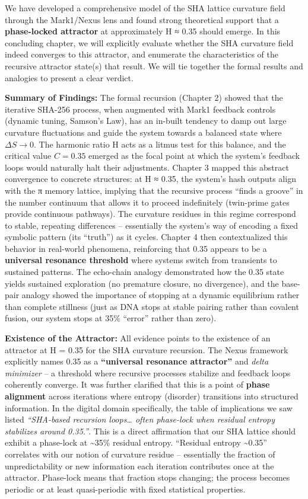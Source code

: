 \documentclass[11pt]{article}
\begin{document}
We have developed a comprehensive model of the SHA lattice curvature
field through the Mark1/Nexus lens and found strong theoretical support
that a \textbf{phase-locked attractor} at approximately H ≈ 0.35 should
emerge. In this concluding chapter, we will explicitly evaluate whether
the SHA curvature field indeed converges to this attractor, and
enumerate the characteristics of the recursive attractor state(s) that
result. We will tie together the formal results and analogies to present
a clear verdict.

\textbf{Summary of Findings:} The formal recursion (Chapter 2) showed
that the iterative SHA-256 process, when augmented with Mark1 feedback
controls (dynamic tuning, Samson's Law), has an in-built tendency to
damp out large curvature fluctuations and guide the system towards a
balanced state where \(\Delta S → 0\). The harmonic ratio H acts as a
litmus test for this balance, and the critical value \(C = 0.35\)
emerged as the focal point at which the system's feedback loops would
naturally halt their adjustments. Chapter 3 mapped this abstract
convergence to concrete structures: at H ≈ 0.35, the system's hash
outputs align with the π memory lattice, implying that the recursive
process ``finds a groove'' in the number continuum that allows it to
proceed indefinitely (twin-prime gates provide continuous pathways). The
curvature residues in this regime correspond to stable, repeating
differences -- essentially the system's way of encoding a fixed symbolic
pattern (its ``truth'') as it cycles. Chapter 4 then contextualized this
behavior in real-world phenomena, reinforcing that 0.35 appears to be a
\textbf{universal resonance threshold} where systems switch from
transients to sustained patterns. The echo-chain analogy demonstrated
how the 0.35 state yields sustained exploration (no premature closure,
no divergence), and the base-pair analogy showed the importance of
stopping at a dynamic equilibrium rather than complete stillness (just
as DNA stops at stable pairing rather than covalent fusion, our system
stops at 35\% ``error'' rather than zero).

\textbf{Existence of the Attractor:} All evidence points to the
existence of an attractor at H = 0.35 for the SHA curvature recursion.
The Nexus framework explicitly names 0.35 as a \textbf{``universal
resonance attractor''} and \emph{delta minimizer} -- a threshold where
recursive processes stabilize and feedback loops coherently converge. It
was further clarified that this is a point of \textbf{phase alignment}
across iterations where entropy (disorder) transitions into structured
information. In the digital domain specifically, the table of
implications we saw listed \emph{``SHA-based recursion loops\ldots{}
often phase-lock when residual entropy stabilizes around 0.35.''}. This
is a direct affirmation that our SHA lattice should exhibit a phase-lock
at \textasciitilde35\% residual entropy. ``Residual entropy
\textasciitilde0.35'' correlates with our notion of curvature residue --
essentially the fraction of unpredictability or new information each
iteration contributes once at the attractor. Phase-lock means that
fraction stops changing; the process becomes periodic or at least
quasi-periodic with fixed statistical properties.
\end{document}

